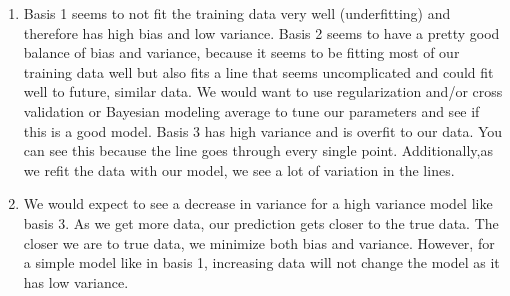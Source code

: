 \documentclass[submit]{harvardml}
\begin{document}
\begin{enumerate}
    \item Basis 1 seems to not fit the training data very well (underfitting) and therefore has high bias and low variance. Basis 2 seems to have a pretty good balance of bias and variance, because it seems to be fitting most of our training data well but also fits a line that seems uncomplicated and could fit well to future, similar data. We would want to use regularization and/or cross validation or Bayesian modeling average to tune our parameters and see if this is a good model. Basis 3 has high variance and is overfit to our data. You can see this because the line goes through every single point. Additionally,as we refit the data with our model, we see a lot of variation in the lines. 
    \item We would expect to see a decrease in variance for a high variance model like basis 3. As we get more data, our prediction gets closer to the true data. The closer we are to true data, we minimize both bias and variance. However, for a simple model like in basis 1, increasing data will not change the model as it has low variance.
\end{enumerate}
\end{document}
